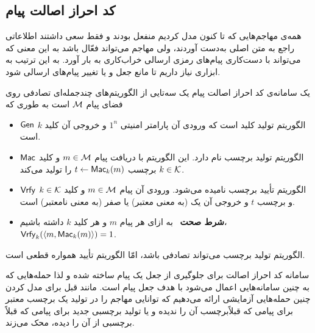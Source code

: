 \subsection*{کد‌ احراز اصالت پیام}
همه‌ی مهاجم‌هایی که تا کنون مدل کردیم منفعل بودند و فقط سعی داشتند اطلاعاتی راجع به متن اصلی به‌دست  آوردند، ولی مهاجم می‌تواند فعّال باشد به این معنی که می‌تواند با دست‌کاری پیام‌های رمزی ارسالی خراب‌کاری به بار آورد. به این ترتیب به ابزاری نیاز داریم تا مانع جعل و یا تغییر پیام‌های ارسالی شود. 
\begin{definition}
یک سامانه‌ی کد احراز اصالت پیام
یک سه‌تایی از الگوریتم‌های چندجمله‌ای تصادفی روی فضای پیام 
${\mathcal M}$
است به طوری که
\begin{itemize}
	\item
	$\mathsf{Gen}$
	 الگوریتم تولید کلید است که ورودی آن پارامتر امنیتی 
	 $1^{n}$
	 و خروجی آن کلید 
	 $k$
	 است.
	 \item
	 $\mathsf{Mac}$
	 الگوریتم تولید برچسب
	 نام‌ دارد. این الگوریتم  با دریافت پیام 
	 $m\in{\mathcal M}$
	 و کلید 
	 $k\in{\mathcal K}$
	  برچسب 
	  $t\leftarrow\mathsf{Mac}_{k}(m)$
	  را تولید می‌کند.
	  \item
	  $\mathsf{Vrfy}$
	  الگوریتم تأیید برچسب نامیده می‌شود. ورودی آن پیام 
	  $m\in{\mathcal M}$
	  و کلید
	  $k\in{\mathcal K}$
	  و برچسب 
	  $t$
	   و خروجی آن یک (به معنی معتبر) یا صفر (به معنی نامعتبر) است. 
	   \item \textbf{شرط صحت} \ 
	    به ازای هر پیام 
	   $m$
	  و هر کلید 
	  $k$
	  داشته باشیم، 
	  $\mathsf{Vrfy}_{k}(\langle m, \mathsf{Mac}_{k}(m)\rangle) = 1$.
\end{itemize}
الگوریتم تولید برچسب می‌تواند تصادفی باشد، امّا الگوریتم تأیید همواره قطعی است.
\end{definition}
سامانه کد احراز اصالت برای جلوگیری از جعل یک پیام ساخته شده و لذا حمله‌هایی که به چنین سامانه‌هایی اعمال می‌شود با هدف جعل پیام است. مانند قبل برای مدل کردن چنین حمله‌هایی آزمایشی ارائه می‌دهیم که توانایی مهاجم را در تولید یک برچسب معتبر برای پیامی که قبلاًبرچسب آن را ندیده و یا تولید برچسبی جدید برای پیامی که قبلاً برچسبی از آن را دیده، محک می‌زند.
